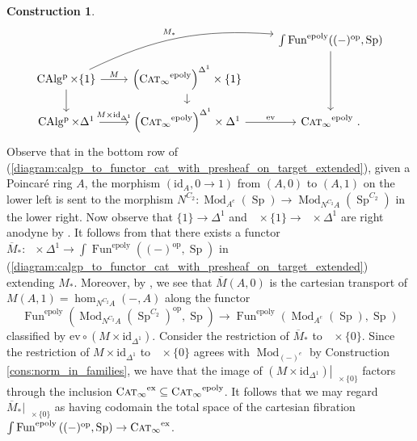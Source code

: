 \documentclass{article}
\DeclareMathOperator{\CAlgp}{CAlg^p} %
\DeclareMathOperator{\CAT}{C\normalfont\textsc{at}_\infty} %
\DeclareMathOperator{\Fun}{Fun} %
\DeclareMathOperator{\Mod}{Mod} %
\DeclareMathOperator{\Spectra}{Sp} %
\newcommand{\op}{\mathrm{op}}
\newcommand{\epoly}{\mathrm{epoly}}
\theoremstyle{definition}
\newtheorem{construction}[equation]{Construction}
\begin{document}
\begin{construction}
    \begin{equation}\label{diagram:calgp_to_functor_cat_with_presheaf_on_target_extended}
    \begin{tikzcd}[row sep=small]
        & & \int \Fun^{\epoly}( (-)^\op, \Spectra) \ar[dd] \\
        \CAlgp \times \{1\} \ar[r,"M"] \ar[rru,bend left=15,"{M_*}"] \ar[d] & \left(\CAT^\epoly\right)^{\Delta^1} \times \{1\} \ar[d] &  \\
        \CAlgp \times \Delta^1 \ar[r,"{M \times \mathrm{id}_{\Delta^1}}"] & \left(\CAT^\epoly\right)^{\Delta^1} \times \Delta^1 \ar[r,"{\mathrm{ev}}"] & \CAT^\epoly  \,.
    \end{tikzcd}
    \end{equation}
    Observe that in the bottom row of (\ref{diagram:calgp_to_functor_cat_with_presheaf_on_target_extended}), given a Poincaré ring $ A $, the morphism $ (\mathrm{id}_A, 0\to 1) $ from $ (A,0) $ to $ (A, 1) $ on the lower left is sent to the morphism $ N^{C_2} \colon \Mod_{A^e}(\Spectra) \to \Mod_{N^{C_2}A}\left(\Spectra^{C_2} \right) $ in the lower right. 
    Now observe that $ \{1\} \to \Delta^1 $ and $ \CAlgp \times \{1\} \to \CAlgp \times \Delta^1 $ are right anodyne by \cite[Corollary 2.1.2.7]{HTT}. 
    It follows from \cites[Corollary 2.4.2.5]{HTT}[\href{https://kerodon.net/tag/01VF}{Tag 01VF} Theorem 5.2.1.1(1)]{kerodon} that there exists a functor $ \overline{M}_* \colon \CAlgp \times \Delta^1 \to \int \Fun^\epoly\left((-)^\op,\Spectra\right) $ in (\ref{diagram:calgp_to_functor_cat_with_presheaf_on_target_extended}) extending $ M_* $. 
    Moreover, by \cite[\href{https://kerodon.net/tag/01VF}{Tag 01VF} Theorem 5.2.1.1(2)]{kerodon}, we see that $ \overline{M}(A,0) $ is the cartesian transport of $ M (A, 1) = \hom_{N^{C_2}A}(-,A) $ along the functor $$ \Fun^\epoly\left(\Mod_{N^{C_2} A}\left(\Spectra^{C_2}\right) ^\op, \Spectra\right) \to \Fun^\epoly\left(\Mod_{A^e}\left(\Spectra\right),\Spectra\right) $$ classified by $ \mathrm{ev} \circ \left(M \times \mathrm{id}_{\Delta^1}\right) $. 
    Consider the restriction of $ \overline{M}_* $ to $ \CAlgp \times \{0\} $. 
    Since the restriction of $ M \times \mathrm{id}_{\Delta^1} $ to $ \CAlgp \times \{0\} $ agrees with $ \Mod_{(-)^e} $ by Construction \ref{cons:norm_in_families}, we have that the image of $ \left.\left( M \times \mathrm{id}_{\Delta^1} \right)\right|_{\CAlgp \times \{0\}} $ factors through the inclusion $ \CAT^{\mathrm{ex}} \subseteq \CAT^\epoly $.  
    It follows that we may regard $ \overline{M}_*|_{\CAlgp \times \{0\}} $ as having codomain the total space of the cartesian fibration $ \int \Fun^\epoly\left((-)^\op,\Spectra\right) \to \CAT^{\mathrm{ex}} $. 


\end{construction}
\end{document}

